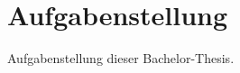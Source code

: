 %
%
\chapter{Aufgabenstellung}\label{ch:aufgabenstellung}
    Aufgabenstellung dieser Bachelor-Thesis.
    

  
